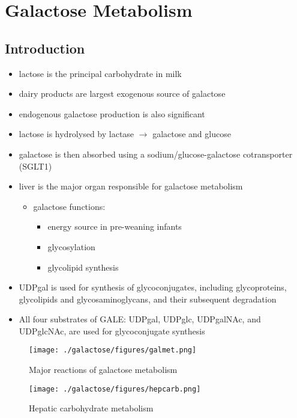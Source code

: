 \documentclass{scrartcl}
\begin{document}
\section{Galactose Metabolism}
\label{sec:orgd524306}
\subsection{Introduction}
\label{sec:org20f1875}

\begin{itemize}
\item lactose is the principal carbohydrate in milk
\item dairy products are largest exogenous source of galactose
\item endogenous galactose production is also significant
\item lactose is hydrolysed by lactase \(\to\) galactose and glucose
\item galactose is then absorbed using a sodium/glucose-galactose cotransporter (SGLT1)
\item liver is the major organ responsible for galactose metabolism
\begin{itemize}
\item galactose functions:
\begin{itemize}
\item energy source in pre-weaning infants
\item glycosylation
\item glycolipid synthesis
\end{itemize}
\end{itemize}

\item UDPgal is used for synthesis of glycoconjugates, including
glycoproteins, glycolipids and glycosaminoglycans, and their
subsequent degradation
\item All four substrates of GALE: UDPgal, UDPglc, UDPgalNAc, and
UDPglcNAc, are used for glycoconjugate synthesis
\end{itemize}


\begin{figure}[htbp]
\centering
\texttt{[image: ./galactose/figures/galmet.png]}
\caption{\label{fig:org4b5d58b}
Major reactions of galactose metabolism}
\end{figure}


\begin{figure}[htbp]
\centering
\texttt{[image: ./galactose/figures/hepcarb.png]}
\caption{\label{fig:org665ce55}
Hepatic carbohydrate metabolism}
\end{figure}
\end{document}

